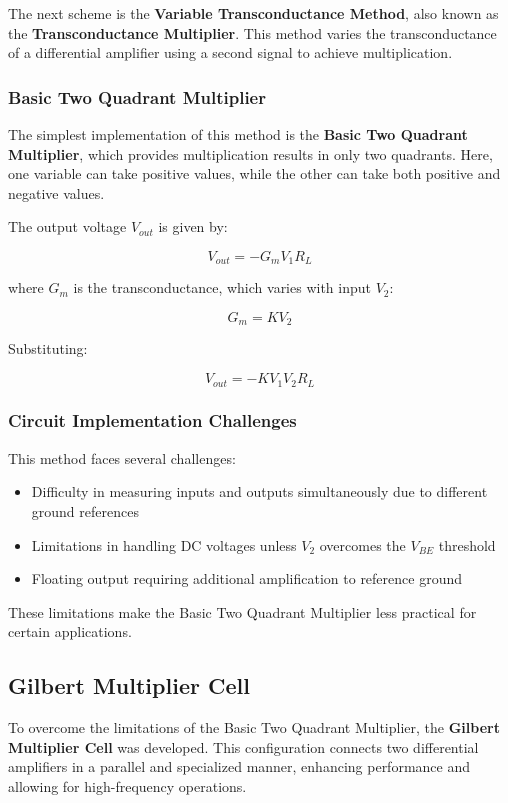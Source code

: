 The next scheme is the \textbf{Variable Transconductance Method}, also known as the \textbf{Transconductance Multiplier}. This method varies the transconductance of a differential amplifier using a second signal to achieve multiplication.

\subsubsection{Basic Two Quadrant Multiplier}

The simplest implementation of this method is the \textbf{Basic Two Quadrant Multiplier}, which provides multiplication results in only two quadrants. Here, one variable can take positive values, while the other can take both positive and negative values.

The output voltage \( V_{out} \) is given by:

\[
V_{out} = -G_m V_1 R_L
\]

where \( G_m \) is the transconductance, which varies with input \( V_2 \):

\[
G_m = K V_2
\]

Substituting:

\[
V_{out} = -K V_1 V_2 R_L
\]

\subsubsection{Circuit Implementation Challenges}

This method faces several challenges:

\begin{itemize}
    \item Difficulty in measuring inputs and outputs simultaneously due to different ground references
    \item Limitations in handling DC voltages unless \( V_2 \) overcomes the \( V_{BE} \) threshold
    \item Floating output requiring additional amplification to reference ground
\end{itemize}

These limitations make the Basic Two Quadrant Multiplier less practical for certain applications.

\subsection{Gilbert Multiplier Cell}

To overcome the limitations of the Basic Two Quadrant Multiplier, the \textbf{Gilbert Multiplier Cell} was developed. This configuration connects two differential amplifiers in a parallel and specialized manner, enhancing performance and allowing for high-frequency operations.

